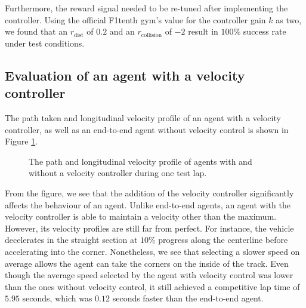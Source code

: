 Furthermore, the reward signal needed to be re-tuned after implementing the controller.
Using the official F1tenth gym's value for the controller gain $k$ as two, we found that an $r_{\text{dist}}$ of $0.2$ and an $r_{\text{collision}}$ of $-2$ result in $100\%$ success rate under test conditions.

% 

%     

%     

\subsection{Evaluation of an agent with a velocity controller}

The path taken and longitudinal velocity profile of an agent with a velocity controller, as well as an end-to-end agent without velocity control is shown in Figure \ref{fig:velocity_control_lap}.
\begin{figure}[htb!]
    \centering
    
    \caption[Agents with and without a velocity controller completing one test lap]{The path and longitudinal velocity profile of agents with and without a velocity controller during one test lap.}
    \label{fig:velocity_control_lap}
\end{figure}
From the figure, we see that the addition of the velocity controller significantly affects the behaviour of an agent.
Unlike end-to-end agents, an agent with the velocity controller is able to maintain a velocity other than the maximum.
However, its velocity profiles are still far from perfect.
For instance, the vehicle decelerates in the straight section at $10\%$ progress along the centerline before accelerating into the corner.
Nonetheless, we see that selecting a slower speed on average allows the agent can take the corners on the inside of the track.
Even though the average speed selected by the agent with velocity control was lower than the ones without velocity control, it still achieved a competitive lap time of $5.95$ seconds, which was $0.12$ seconds faster than the end-to-end agent.

